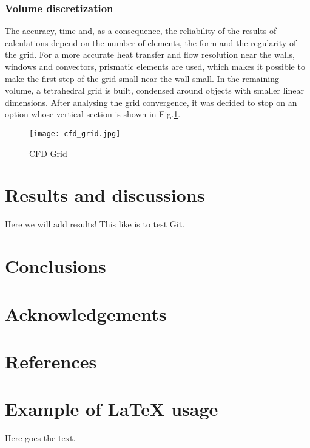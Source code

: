 \documentclass[preprint,12pt]{elsarticle}
\begin{document}
\subsubsection{Volume discretization}
The accuracy, time and, as a consequence, the reliability of the results of calculations depend on the number of elements, the form and the regularity of the grid. For a more accurate heat transfer and flow resolution near the walls, windows and convectors, prismatic elements are used, which makes it possible to make the first step of the grid small near the wall small. In the remaining volume, a tetrahedral grid is built, condensed around objects with smaller linear dimensions. After analysing the grid convergence, it was decided to stop on an option whose vertical section is shown in Fig.\ref{fig:cfd_grid}.


\begin{figure}
\centering

\texttt{[image: cfd\_grid.jpg]}
\caption{CFD Grid}\label{fig:cfd_grid}

\end{figure}



\section{Results and discussions}
Here we will add results! This like is to test Git.

\section{Conclusions}

\section*{Acknowledgements}

\section*{References}

\section*{Example of LaTeX usage}

Here goes the text.
\end{document}

